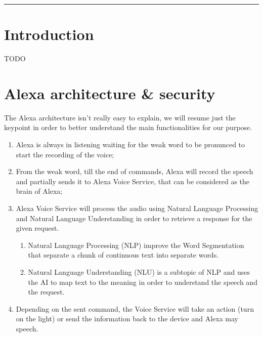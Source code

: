 \documentclass[sigconf]{acmart}
\begin{document}

\begin{teaserfigure}
\rule{\linewidth}{1mm}
\end{teaserfigure}

\maketitle


\section{Introduction}
TODO

\section{Alexa architecture \& security}
The Alexa architecture isn't really easy to explain, we will resume just the keypoint in order to better understand the main functionalities for our purpose.
\begin{enumerate}
    \item Alexa is always in listening waiting for the weak word to be pronunced to start the recording of the voice;
    \item From the weak word, till the end of commands, Alexa will record the speech and partially sends it to Alexa Voice Service, that can be considered as the brain of Alexa;
    \item Alexa Voice Service will process the audio using Natural Language Processing and Natural Language Understanding in order to retrieve a response for the given request.
	\begin{enumerate}
		\item Natural Language Processing (NLP) improve the Word Segmentation that separate a chunk of continuous text into separate words.
		\item Natural Language Understanding (NLU) is a subtopic of NLP and uses the AI to map text to the meaning\cite{NLU} in order to understand the speech and the request.
	\end{enumerate}
    \item Depending on the sent command, the Voice Service will take an action (turn on the light) or send the information back to the device and Alexa may speech.
\end{enumerate}
\end{document}
